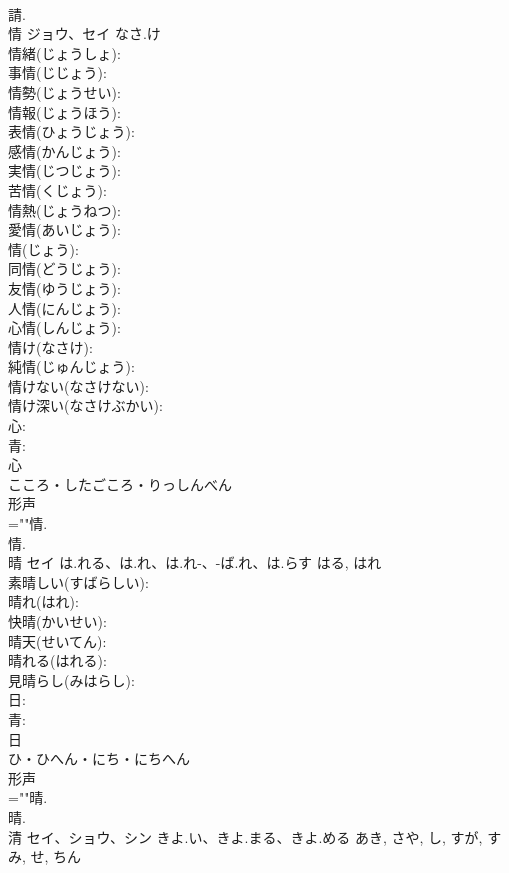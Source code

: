 \documentclass[8pt]{extreport}
\begin{document}
\begin{CJK}{UTF8}{min}
\\	請.
\\	情	ジョウ、セイ	なさ.け		
\\	情緒(じょうしょ): 
\\	事情(じじょう): 
\\	情勢(じょうせい): 
\\	情報(じょうほう): 
\\	表情(ひょうじょう): 
\\	感情(かんじょう): 
\\	実情(じつじょう): 
\\	苦情(くじょう): 
\\	情熱(じょうねつ): 
\\	愛情(あいじょう): 
\\	情(じょう): 
\\	同情(どうじょう): 
\\	友情(ゆうじょう): 
\\	人情(にんじょう): 
\\	心情(しんじょう): 
\\	情け(なさけ): 
\\	純情(じゅんじょう): 
\\	情けない(なさけない): 
\\	情け深い(なさけぶかい): 
\\	心: 
\\	青: 
\\	心	
\\	こころ・したごころ・りっしんべん	
\\	形声 
\\	=""情.
\\	情.
\\	晴	セイ	は.れる、は.れ、は.れ-、-ば.れ、は.らす	はる, はれ	
\\	素晴しい(すばらしい): 
\\	晴れ(はれ): 
\\	快晴(かいせい): 
\\	晴天(せいてん): 
\\	晴れる(はれる): 
\\	見晴らし(みはらし): 
\\	日: 
\\	青: 
\\	日	
\\	ひ・ひへん・にち・にちへん	
\\	形声 
\\	=""晴.
\\	晴.
\\	清	セイ、ショウ、シン	きよ.い、きよ.まる、きよ.める	あき, さや, し, すが, すみ, せ, ちん	

\end{CJK}
\end{document}
